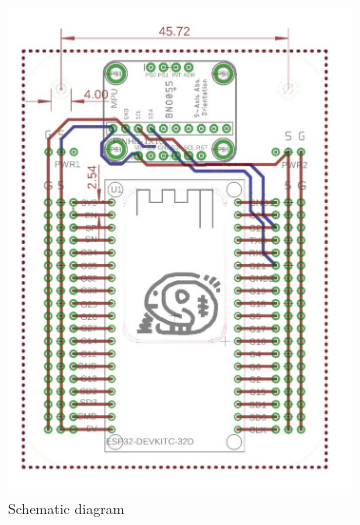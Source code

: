 \begin{figure}[ht]
    \centering
    \begin{subfigure}[b]{0.4\textwidth}
         \centering
         \includegraphics[width=\textwidth]{figures/Electronics/intefeceSCH.pdf}
         \caption{Schematic diagram}
         \label{fig:intefeceSCH}
     \end{subfigure}
    \begin{subfigure}[b]{0.4\textwidth}
         \centering

\end{subfigure}
\end{figure}
